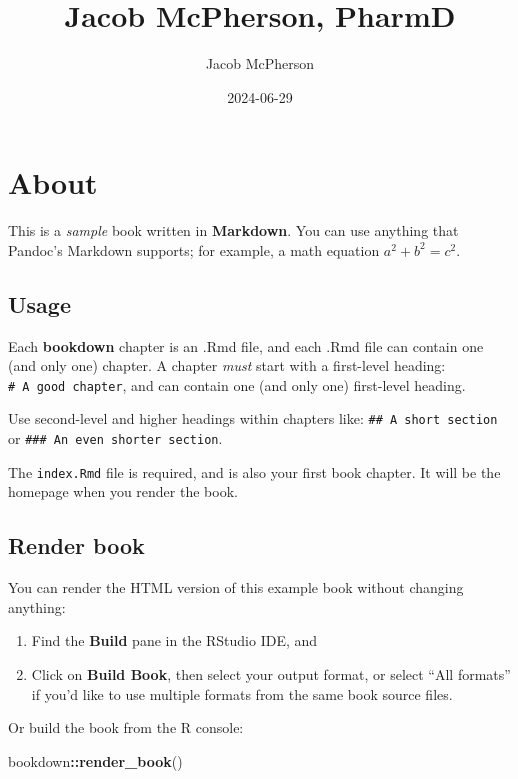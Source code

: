 \documentclass[
]{book}
\title{Jacob McPherson, PharmD}
\author{Jacob McPherson}
\date{2024-06-29}
\newenvironment{Shaded}{\begin{snugshade}}{\end{snugshade}}
\newcommand{\FunctionTok}[1]{\textcolor[rgb]{0.13,0.29,0.53}{\textbf{#1}}}
\newcommand{\NormalTok}[1]{#1}
\newcommand{\SpecialCharTok}[1]{\textcolor[rgb]{0.81,0.36,0.00}{\textbf{#1}}}
\begin{document}
\maketitle

{
\setcounter{tocdepth}{1}
\tableofcontents
}
\chapter{About}\label{about}

This is a \emph{sample} book written in \textbf{Markdown}. You can use anything that Pandoc's Markdown supports; for example, a math equation \(a^2 + b^2 = c^2\).

\section{Usage}\label{usage}

Each \textbf{bookdown} chapter is an .Rmd file, and each .Rmd file can contain one (and only one) chapter. A chapter \emph{must} start with a first-level heading: \texttt{\#\ A\ good\ chapter}, and can contain one (and only one) first-level heading.

Use second-level and higher headings within chapters like: \texttt{\#\#\ A\ short\ section} or \texttt{\#\#\#\ An\ even\ shorter\ section}.

The \texttt{index.Rmd} file is required, and is also your first book chapter. It will be the homepage when you render the book.

\section{Render book}\label{render-book}

You can render the HTML version of this example book without changing anything:

\begin{enumerate}
\def\labelenumi{\arabic{enumi}.}
\item
  Find the \textbf{Build} pane in the RStudio IDE, and
\item
  Click on \textbf{Build Book}, then select your output format, or select ``All formats'' if you'd like to use multiple formats from the same book source files.
\end{enumerate}

Or build the book from the R console:

\begin{Shaded}
\begin{Highlighting}[]
\NormalTok{bookdown}\SpecialCharTok{::}\FunctionTok{render\_book}\NormalTok{()}
\end{Highlighting}
\end{Shaded}
\end{document}

